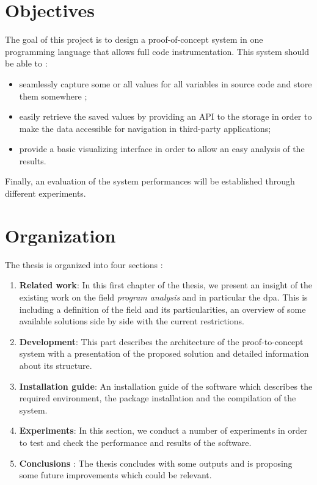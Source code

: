 \section{Objectives}
The goal of this project is to design a proof-of-concept system in one programming language that allows full code instrumentation. This system should be able to :
\begin{itemize}
   \item seamlessly capture some or all values for all variables in source code and store them somewhere ;
   \item easily retrieve the saved values by providing an API to the storage in order to make the data accessible for navigation in third-party applications;
   \item provide a basic visualizing interface in order to allow an easy analysis of the results.  
 \end{itemize}  
 Finally, an evaluation of the system performances will be established through different experiments.

\section{Organization}
The thesis is organized into four sections :
\begin{enumerate}
  \item \textbf{Related work}: In this first chapter of the thesis, we present an insight of the existing work on the field \textit{program analysis} and in particular the \gls{dpa}. This is including a definition of the field and its particularities, an overview of some available solutions side by side with the current restrictions.
  \item \textbf{Development}: This part describes the architecture of the proof-to-concept system with a presentation of the proposed solution and detailed information about its structure.
  \item \textbf{Installation guide}: An installation guide of the software which describes the required environment, the package installation and the compilation of the system.
  \item \textbf{Experiments}: In this section, we conduct a number of experiments in order to test and check the performance and results of the software.
  \item \textbf{Conclusions} : The thesis concludes with some outputs and is proposing some future improvements which could be relevant.
\end{enumerate}
